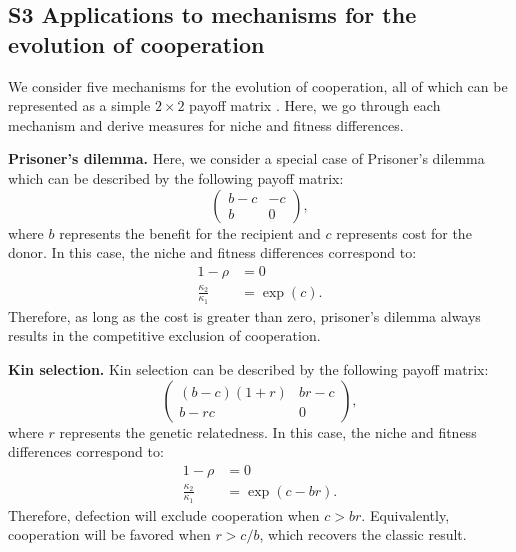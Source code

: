 \documentclass[12pt]{article}
\begin{document}
\subsection*{S3 Applications to mechanisms for the evolution of cooperation}

We consider five mechanisms for the evolution of cooperation, all of which can be represented as a simple $2\times 2$ payoff matrix \citep{nowak2006five}.
Here, we go through each mechanism and derive measures for niche and fitness differences.

\textbf{Prisoner's dilemma.}
Here, we consider a special case of Prisoner's dilemma which can be described by the following payoff matrix:
\begin{equation}
\begin{pmatrix}
b-c & -c \\
b & 0
\end{pmatrix},
\end{equation}
where $b$ represents the benefit for the recipient and $c$ represents cost for the donor.
In this case, the niche and fitness differences correspond to:
\begin{align}
1-\rho &= 0\\
\frac{\kappa_2}{\kappa_1} &= \exp\left(c\right).
\end{align}
Therefore, as long as the cost is greater than zero, prisoner's dilemma always results in the competitive exclusion of cooperation.

\textbf{Kin selection.}
Kin selection can be described by the following payoff matrix:
\begin{equation}
\begin{pmatrix}
(b-c)(1+r) & br-c \\
b-rc & 0
\end{pmatrix},
\end{equation}
where $r$ represents the genetic relatedness. 
In this case, the niche and fitness differences correspond to:
\begin{align}
1-\rho &= 0\\
\frac{\kappa_2}{\kappa_1} &= \exp\left(c-br\right).
\end{align}
Therefore, defection will exclude cooperation when $c > br$. Equivalently, cooperation will be favored when $r > c/b$, which recovers the classic result.
\end{document}

